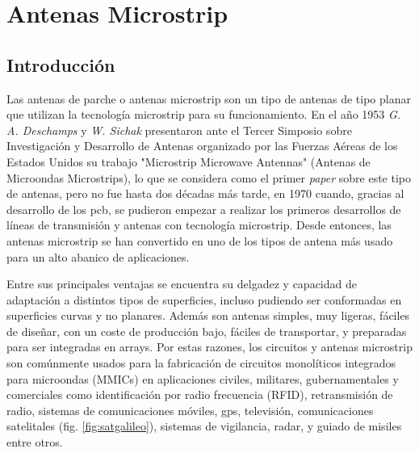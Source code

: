 
\chapter{Antenas Microstrip}
\label{antenasmicrostrip}

\section{Introducción}
\par Las antenas de parche o antenas microstrip son un tipo de antenas de tipo planar que utilizan la tecnología microstrip para su funcionamiento. En el año 1953 \textit{G. A. Deschamps} y \textit{W. Sichak} presentaron ante el Tercer Simposio sobre Investigación y Desarrollo de Antenas organizado por las Fuerzas Aéreas de los Estados Unidos su trabajo "Microstrip Microwave Antennas" (Antenas de Microondas Microstrips), lo que se considera como el primer \textit{paper} sobre este tipo de antenas, pero no fue hasta dos décadas más tarde, en 1970 cuando, gracias al desarrollo de los \gls{pcb}, se pudieron empezar a realizar los primeros desarrollos de líneas de transmisión y antenas con tecnología microstrip. Desde entonces, las antenas microstrip se han convertido en uno de los tipos de antena más usado para un alto abanico de aplicaciones. \cite{Bernhard2003, Balanis2015} 
\\
\par Entre sus principales ventajas se encuentra su delgadez y capacidad de adaptación a distintos tipos de superficies, incluso pudiendo ser conformadas en superficies curvas y no planares. Además son antenas simples, muy ligeras, fáciles de diseñar, con un coste de producción bajo, fáciles de transportar, y preparadas para ser integradas en arrays. Por estas razones, los circuitos y antenas microstrip son comúnmente usados para la fabricación de circuitos monolíticos integrados para microondas (MMICs) en aplicaciones civiles, militares, gubernamentales y comerciales como identificación por radio frecuencia (RFID), retransmisión de radio, sistemas de comunicaciones móviles, \gls{gps}, televisión, comunicaciones satelitales (fig. \ref{fig:satgalileo}), sistemas de vigilancia, radar, y guiado de misiles entre otros. \cite{Aquino2008} 

